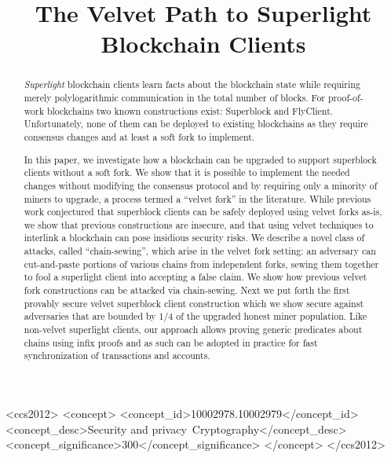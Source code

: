 \documentclass[sigconf, anonymous]{acmart}
\theoremstyle{plain}
\theoremstyle{definition}
\begin{document}
\title{%
The Velvet Path to Superlight Blockchain Clients
} %

\begin{abstract}
{\em Superlight} blockchain clients
learn facts about the blockchain state
while requiring merely polylogarithmic communication in the total 
number of blocks. 
For proof-of-work blockchains 
two known constructions exist: Superblock and FlyClient. 
%
Unfortunately, none of them can be deployed to existing blockchains as  they require consensus changes  and at least a soft fork to implement.

In this paper, we
investigate how a blockchain can be upgraded to support superblock clients without a soft fork. We show that it is possible to implement the needed changes without modifying the consensus protocol and by requiring only a minority of miners to upgrade, a process termed a ``velvet fork'' in the literature. While previous work conjectured that superblock clients can be safely deployed using velvet forks as-is, we show that previous constructions are insecure, and that using velvet techniques to interlink a blockchain can pose insidious security risks. We describe a novel class of attacks, called  ``chain-sewing'', which arise in the velvet fork setting: an adversary can cut-and-paste portions of various chains from independent forks, sewing them together to 
fool a superlight client into accepting a false claim.
We show how previous velvet fork constructions can be attacked via chain-sewing. 
Next we put forth the first provably secure velvet superblock client construction which we show  secure against adversaries that are bounded by 1/4 of the upgraded honest miner population. 
Like non-velvet superlight clients, our approach allows proving generic predicates about chains using infix proofs and as such can be adopted in practice for fast synchronization of transactions and accounts.
\end{abstract}

\begin{CCSXML}
    <ccs2012>
    <concept>
    <concept_id>10002978.10002979</concept_id>
    <concept_desc>Security and privacy~Cryptography</concept_desc>
    <concept_significance>300</concept_significance>
    </concept>
    </ccs2012>
\end{CCSXML}




\maketitle





\end{document}
